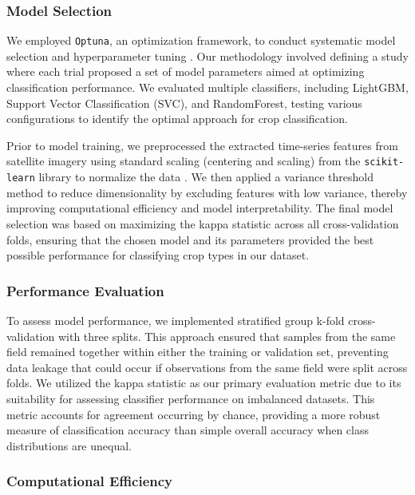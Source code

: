 \documentclass[
  journal,
  twocolumn]{IEEEtran}
\begin{document}
\subsubsection{Model Selection}\label{model-selection}

We employed \texttt{Optuna}, an optimization framework, to conduct
systematic model selection and hyperparameter tuning
\citep{optuna_2019}. Our methodology involved defining a study where
each trial proposed a set of model parameters aimed at optimizing
classification performance. We evaluated multiple classifiers, including
LightGBM, Support Vector Classification (SVC), and RandomForest, testing
various configurations to identify the optimal approach for crop
classification.

Prior to model training, we preprocessed the extracted time-series
features from satellite imagery using standard scaling (centering and
scaling) from the \texttt{scikit-learn} library to normalize the data
\citep{scikit-learn}. We then applied a variance threshold method to
reduce dimensionality by excluding features with low variance, thereby
improving computational efficiency and model interpretability. The final
model selection was based on maximizing the kappa statistic across all
cross-validation folds, ensuring that the chosen model and its
parameters provided the best possible performance for classifying crop
types in our dataset.

\subsubsection{Performance Evaluation}\label{performance-evaluation}

To assess model performance, we implemented stratified group k-fold
cross-validation with three splits. This approach ensured that samples
from the same field remained together within either the training or
validation set, preventing data leakage that could occur if observations
from the same field were split across folds. We utilized the kappa
statistic as our primary evaluation metric due to its suitability for
assessing classifier performance on imbalanced datasets. This metric
accounts for agreement occurring by chance, providing a more robust
measure of classification accuracy than simple overall accuracy when
class distributions are unequal.

\subsubsection{Computational Efficiency}\label{computational-efficiency}
\end{document}
